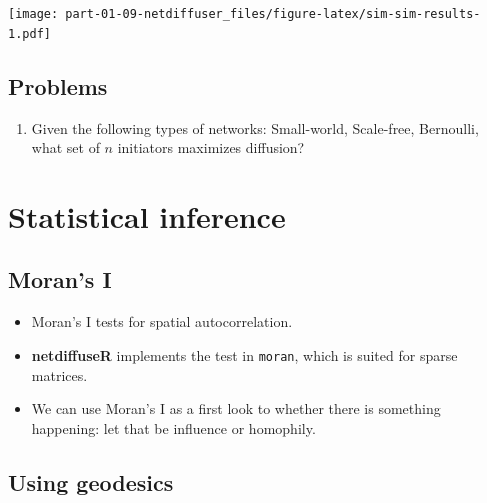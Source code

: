 \documentclass[
]{book}
\providecommand{\tightlist}{%
  \setlength{\itemsep}{0pt}\setlength{\parskip}{0pt}}
\begin{document}
\texttt{[image: part-01-09-netdiffuser\_files/figure-latex/sim-sim-results-1.pdf]}

\hypertarget{problems-1}{%
\subsection{Problems}\label{problems-1}}

\begin{enumerate}
\def\labelenumi{\arabic{enumi}.}
\tightlist
\item
  Given the following types of networks: Small-world, Scale-free, Bernoulli,
  what set of \(n\) initiators maximizes diffusion?
\end{enumerate}

\hypertarget{statistical-inference}{%
\section{Statistical inference}\label{statistical-inference}}

\hypertarget{morans-i}{%
\subsection{Moran's I}\label{morans-i}}

\begin{itemize}
\item
  Moran's I tests for spatial autocorrelation.
\item
  \textbf{netdiffuseR} implements the test in \texttt{moran}, which is suited for sparse matrices.
\item
  We can use Moran's I as a first look to whether there is something happening:
  let that be influence or homophily.
\end{itemize}

\hypertarget{using-geodesics}{%
\subsection{Using geodesics}\label{using-geodesics}}
\end{document}
